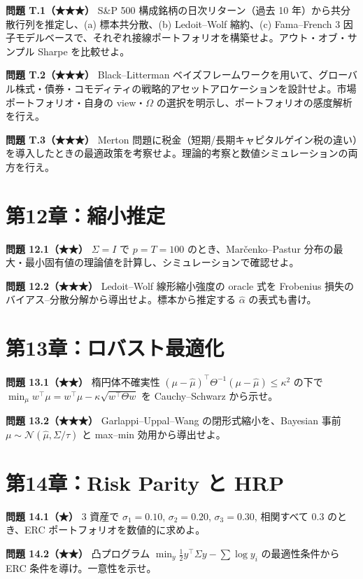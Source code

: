 \documentclass[11pt,a4paper]{report}
\begin{document}
\textbf{問題 T.1（★★★）} S\&P 500 構成銘柄の日次リターン（過去 10 年）から共分散行列を推定し、(a) 標本共分散、(b) Ledoit–Wolf 縮約、(c) Fama–French 3 因子モデルベースで、それぞれ接線ポートフォリオを構築せよ。アウト・オブ・サンプル Sharpe を比較せよ。

\textbf{問題 T.2（★★★）} Black–Litterman ベイズフレームワークを用いて、グローバル株式・債券・コモディティの戦略的アセットアロケーションを設計せよ。市場ポートフォリオ・自身の view・$\Omega$ の選択を明示し、ポートフォリオの感度解析を行え。

\textbf{問題 T.3（★★★）} Merton 問題に税金（短期/長期キャピタルゲイン税の違い）を導入したときの最適政策を考察せよ。理論的考察と数値シミュレーションの両方を行え。

\section{第12章：縮小推定}

\textbf{問題 12.1（★★）} $\Sigma = I$ で $p = T = 100$ のとき、Marčenko–Pastur 分布の最大・最小固有値の理論値を計算し、シミュレーションで確認せよ。

\textbf{問題 12.2（★★★）} Ledoit–Wolf 線形縮小強度の oracle 式を Frobenius 損失のバイアス–分散分解から導出せよ。標本から推定する $\hat\alpha$ の表式も書け。

\section{第13章：ロバスト最適化}

\textbf{問題 13.1（★★）} 楕円体不確実性 $(\mu - \hat\mu)^\top \Theta^{-1} (\mu - \hat\mu) \le \kappa^2$ の下で $\min_\mu w^\top \mu = w^\top \hat\mu - \kappa \sqrt{w^\top \Theta w}$ を Cauchy–Schwarz から示せ。

\textbf{問題 13.2（★★★）} Garlappi–Uppal–Wang の閉形式縮小を、Bayesian 事前 $\mu \sim \mathcal{N}(\hat\mu, \Sigma/\tau)$ と max–min 効用から導出せよ。

\section{第14章：Risk Parity と HRP}

\textbf{問題 14.1（★）} 3 資産で $\sigma_1 = 0.10$, $\sigma_2 = 0.20$, $\sigma_3 = 0.30$, 相関すべて $0.3$ のとき、ERC ポートフォリオを数値的に求めよ。

\textbf{問題 14.2（★★）} 凸プログラム $\min_y \tfrac{1}{2} y^\top \Sigma y - \sum \log y_i$ の最適性条件から ERC 条件を導け。一意性を示せ。
\end{document}
